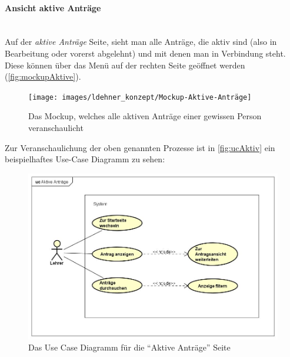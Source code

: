 \paragraph{Ansicht aktive Anträge}
~\\
Auf der \textit{aktive Anträge} Seite, sieht man alle Anträge, die aktiv sind (also in Bearbeitung oder vorerst abgelehnt) und mit denen man in Verbindung steht. Diese können über das Menü auf der rechten Seite geöffnet werden (\autoref{fig:mockupAktive}).
\begin{figure}[H]
	\centering
	\texttt{[image: images/ldehner\_konzept/Mockup-Aktive-Anträge]}
	\caption[Mokup aktive Anträge]{Das Mockup, welches alle aktiven Anträge einer gewissen Person veranschaulicht}
	\label{fig:mockupAktive}
\end{figure}
Zur Veranschaulichung der oben genannten Prozesse ist in \autoref{fig:ucAktiv} ein beispielhaftes Use-Case Diagramm zu sehen: 
\begin{figure}[H]
	\centering
	\includegraphics[width=1\linewidth]{images/ldehner_konzept/uc-active}
	\caption[Use Case Diagramm Aktive Anträge]{Das Use Case Diagramm für die \enquote{Aktive Anträge} Seite}
	\label{fig:ucAktiv}
\end{figure}
\newpage
